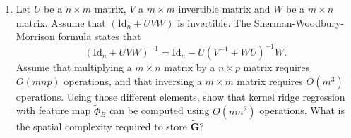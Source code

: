 \documentclass[12pt]{article}
\renewcommand{\b}[1]{\mathbf{#1 }}
\renewcommand{\t}[1]{\tilde{#1}}
\newcommand{\Id}{\mathrm{Id}}
\begin{document}
\begin{enumerate}
\begin{enumerate}
\item  Let $U$ be a $n\times m$ matrix, $V$ a $m\times m$ invertible matrix and $W$ be a $m\times n$ matrix. Assume that $(\Id_n + UVW)$ is invertible. The Sherman-Woodbury-Morrison formula states that
\[ (\Id_n + UVW)^{-1} =\Id_n - U(V^{-1}+ WU)^{-1}W.\]
 Assume that multiplying a $m\times n$ matrix by a $n\times p$ matrix requires $O(mnp)$ operations, and that inversing a $m\times m$ matrix requires $O(m^3)$ operations. Using those different elements, show that kernel ridge regression with feature map $\t \Phi_B$ can be computed using $O(nm^2)$ operations. What is the spatial complexity required to store $\b{\tilde G}$?
\end{enumerate}

\end{enumerate}
\end{document}

